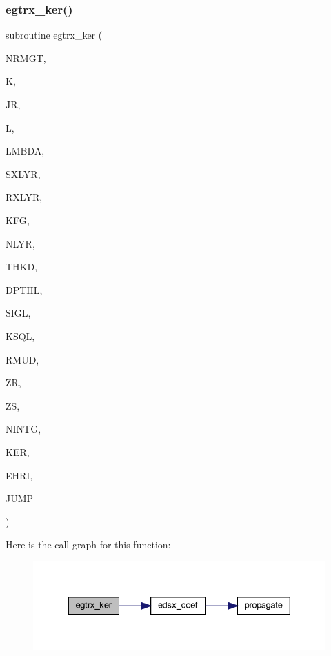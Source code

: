 \subsubsection{\texorpdfstring{egtrx\+\_\+ker()}{egtrx\_ker()}}
{\footnotesize\ttfamily subroutine egtrx\+\_\+ker (\begin{DoxyParamCaption}\item[{integer}]{N\+R\+M\+GT,  }\item[{integer}]{K,  }\item[{integer}]{JR,  }\item[{integer}]{L,  }\item[{real (kind=ql)}]{L\+M\+B\+DA,  }\item[{integer}]{S\+X\+L\+YR,  }\item[{integer}]{R\+X\+L\+YR,  }\item[{integer}]{K\+FG,  }\item[{integer}]{N\+L\+YR,  }\item[{real(kind=ql), dimension (nlyr)}]{T\+H\+KD,  }\item[{real(kind=ql), dimension (nlyr)}]{D\+P\+T\+HL,  }\item[{complex(kind=ql), dimension (nlyr)}]{S\+I\+GL,  }\item[{complex(kind=ql), dimension (nlyr)}]{K\+S\+QL,  }\item[{real (kind=ql), dimension(0\+:nlyr)}]{R\+M\+UD,  }\item[{real (kind=ql)}]{ZR,  }\item[{real (kind=ql)}]{ZS,  }\item[{integer}]{N\+I\+N\+TG,  }\item[{complex (kind=ql), dimension(jnlo-\/nrmgt\+:jnhi,6)}]{K\+ER,  }\item[{complex (kind=ql), dimension(nrmgt,6)}]{E\+H\+RI,  }\item[{logical}]{J\+U\+MP }\end{DoxyParamCaption})}

Here is the call graph for this function\+:\nopagebreak
\begin{figure}[H]
\begin{center}
\leavevmode
\includegraphics[width=330pt]{Leroi__c_8f90_aed79c3eb3332f2cd1b4c25c6c825e360_cgraph}
\end{center}
\end{figure}
\mbox{\label{Leroi__c_8f90_a4ee1c663696c56423ddfdd31af7fbaa8}} 
